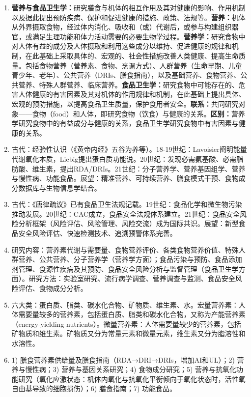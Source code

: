 {\begin{enumerate}[leftmargin=*, itemsep=5pt]
    \item \textbf{营养与食品卫生学：}研究膳食与机体的相互作用及其对健康的影响、作用机制以及据此提出预防疾病、保护和促进健康的措施、政策、法规等。\textbf{营养：}机体从外界摄取食物，经过体内消化、吸收和（或）代谢后，或参与构建组织器官，或满足生理功能和体力活动需要的必要生物学过程。\textbf{营养学：}研究食物中对人体有益的成分及人体摄取和利用这些成分以维持、促进健康的规律和机制，在此基础上采取具体的、宏观的、社会性措施改善人类健康、提高生命质量。包括食物营养（营养素、食物、烹调方式）、人群营养（生命早期、儿童青少年、老年）、公共营养（DRIs、膳食指南），以及基础营养、食物营养、公共营养、特殊人群营养、临床营养。\textbf{食品卫生学：}研究食物中可能存在的、危害人体健康的有害因素及其对机体的作用规律和机制，在此基础上提出具体、宏观的预防措施，以提高食品卫生质量，保护食用者安全。\textbf{联系：}共同研究对象——食物（food）和人体，即研究食物（饮食）与健康的关系。\textbf{区别：}营养学研究食物中的有益成分与健康的关系，食品卫生学研究食物中有害因素与健康的关系。
    \item 古代：经验性认识（《黄帝内经》五谷为养等）。18-19世纪：Lavoisier阐明能量代谢氧化本质，Liebig提出蛋白质功能说。20世纪：发现必需氨基酸、必需脂肪酸、维生素，提出RDA/DRIs。21世纪：分子营养学、营养基因组学、营养与慢性病、功能食品。展望：精准营养、可持续营养、膳食模式干预、食物成分数据库与生物信息学结合。
    \item 古代：《唐律疏议》已有食品卫生法规记载。19世纪：食品化学和微生物污染推动发展。20世纪：CAC成立，食品安全法规体系建立。21世纪：食品安全风险分析框架（风险评估、风险管理、风险交流）成为国际共识。展望：新型食品安全风险评估、快速检测技术、追溯预警体系完善。
    \item 研究内容：营养素代谢与需要量、食物营养评价、各类食物营养价值、特殊人群营养、公共营养、分子营养学（营养学方面）；食品污染与预防、食品添加剂管理、食源性疾病及其预防、食品安全风险分析与监督管理（食品卫生学方面）。研究方法：实验室研究、流行病学调查、营养调查与监测、食品安全风险评估、食物成分分析。
    \item 六大类：蛋白质、脂类、碳水化合物、矿物质、维生素、水。宏量营养素：人体需要量较多的营养素，包括蛋白质、脂类和碳水化合物，又称为产能营养素（energy-yielding nutrients）。微量营养素：人体需要量较少的营养素，包括矿物质和维生素。矿物质又分为常量元素和微量元素，维生素又分为脂溶性和水溶性。
    \item 1) 膳食营养素供给量及膳食指南（RDA→DRI→DRIs，增加AI和UL）；2) 营养与慢性病；3) 营养与基因关系研究；4) 食物成分研究；5) 营养与抗氧化功能研究（氧化应激状态：机体内氧化与抗氧化平衡倾向于氧化状态时，活性氧自由基导致的细胞损伤）；6) 膳食指南；7) 功能食品。

\end{enumerate}}
